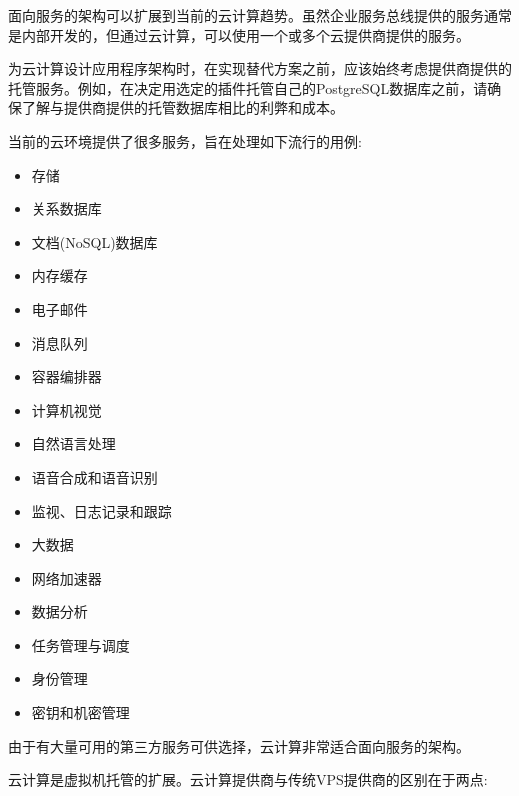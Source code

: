 
面向服务的架构可以扩展到当前的云计算趋势。虽然企业服务总线提供的服务通常是内部开发的，但通过云计算，可以使用一个或多个云提供商提供的服务。

为云计算设计应用程序架构时，在实现替代方案之前，应该始终考虑提供商提供的托管服务。例如，在决定用选定的插件托管自己的PostgreSQL数据库之前，请确保了解与提供商提供的托管数据库相比的利弊和成本。

当前的云环境提供了很多服务，旨在处理如下流行的用例:

\begin{itemize}
\item 
存储

\item 
关系数据库

\item 
文档(NoSQL)数据库

\item 
内存缓存

\item 
电子邮件

\item 
消息队列

\item 
容器编排器

\item 
计算机视觉

\item 
自然语言处理

\item 
语音合成和语音识别

\item 
监视、日志记录和跟踪

\item 
大数据

\item 
网络加速器

\item 
数据分析

\item 
任务管理与调度

\item 
身份管理

\item 
密钥和机密管理
\end{itemize}

由于有大量可用的第三方服务可供选择，云计算非常适合面向服务的架构。


云计算是虚拟机托管的扩展。云计算提供商与传统VPS提供商的区别在于两点:

